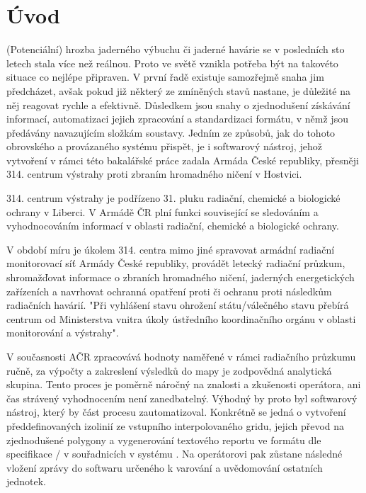 \chapter{Úvod}
\label{1-uvod}

(Potenciální) hrozba jaderného výbuchu či jaderné havárie se v
posledních sto letech stala více než reálnou. Proto ve světě vznikla
potřeba být na takovéto situace co nejlépe připraven. V první řadě
existuje samozřejmě snaha jim předcházet, avšak pokud již některý ze
zmíněných stavů nastane, je důležité na něj reagovat rychle a
efektivně.  Důsledkem jsou snahy o zjednodušení získávání informací,
automatizaci jejich zpracování a standardizaci formátu, v němž jsou
předávány navazujícím složkám soustavy. Jedním ze způsobů, jak do
tohoto obrovského a provázaného systému přispět, je i softwarový
nástroj, jehož vytvoření v rámci této bakalářské práce zadala Armáda
České republiky, přesněji 314. centrum výstrahy proti zbraním
hromadného ničení v Hostvici.

314. centrum výstrahy  je podřízeno 31. pluku radiační,
chemické a biologické ochrany v Liberci. V Armádě ČR plní funkci
související se sledováním a vyhodnocováním informací v oblasti
radiační, chemické a biologické ochrany.

V období míru je úkolem 314. centra mimo jiné spravovat armádní
radiační monitorovací síť Armády České republiky, provádět letecký
radiační průzkum, shromažďovat informace o zbraních hromadného ničení,
jaderných energetických zařízeních a navrhovat ochranná opatření proti
 či ochranu proti následkům radiačních havárií. "Při vyhlášení
stavu ohrožení státu/válečného stavu přebírá centrum od Ministerstva
vnitra úkoly ústředního koordinačního orgánu v oblasti monitorování a
výstrahy". \cite{ZHN}

V současnosti AČR zpracovává hodnoty naměřené v rámci radiačního
průzkumu ručně, za výpočty a zakreslení výsledků do mapy je zodpovědná
analytická skupina. Tento proces je poměrně náročný na znalosti a
zkušenosti operátora, ani čas strávený vyhodnocením není
zanedbatelný. Výhodný by proto byl softwarový nástroj, který by část
procesu zautomatizoval. Konkrétně se jedná o vytvoření
předdefinovaných izolinií ze vstupního interpolovaného gridu, jejich
převod na zjednodušené polygony a vygenerování textového reportu ve
formátu dle specifikace / v souřadnicích v systému
. Na operátorovi pak zůstane následné vložení zprávy do
softwaru určeného k varování a uvědomování ostatních jednotek.

